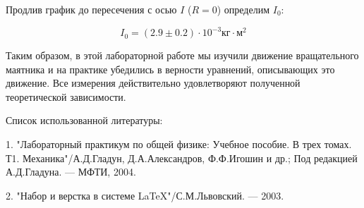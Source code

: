 \documentclass[14pt]{article}
\begin{document}
Продлив график до пересечения с осью $I$ ($R = 0$) определим $I_0$:

$$\boxed{I_0 = (2.9 \pm 0.2)\cdot 10^{-3}\text{кг}\cdot\text{м}^2}$$

\vspace{2cm}
Таким образом, в этой лабораторной работе мы изучили движение вращательного маятника и на практике убедились в верности уравнений, описывающих это движение. Все измерения действительно удовлетворяют полученной теоретической зависимости.

\newpage
Список использованной литературы:
	
\vspace{0.5cm}
1. "Лабораторный практикум по общей физике: Учебное пособие. В трех томах. Т1. Механика"/А.Д.Гладун, Д.А.Александров,
Ф.Ф.Игошин и др.; Под редакцией А.Д.Гладуна. --- МФТИ, 2004.
	
2. "Набор и верстка в системе \LaTeX "/С.М.Львовский. --- 2003.
\end{document}
